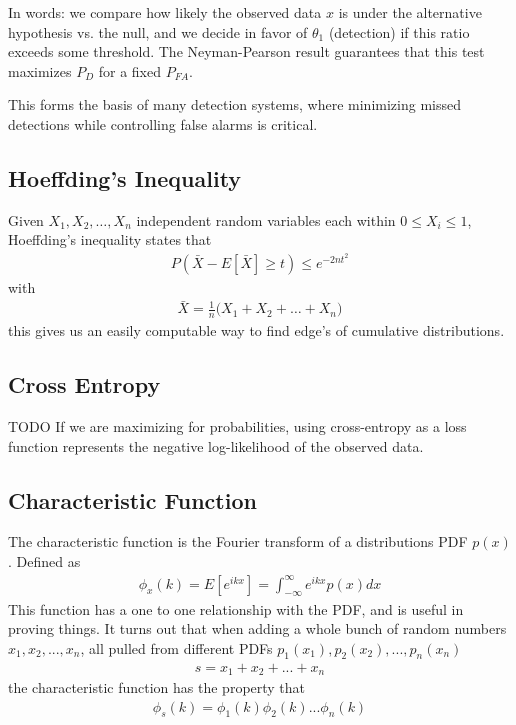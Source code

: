 In words: we compare how likely the observed data $x$ is under the alternative hypothesis vs. the null, and we decide in favor of $\theta_1$ (detection) if this ratio exceeds some threshold. The Neyman-Pearson result guarantees that this test maximizes $P_D$ for a fixed $P_{FA}$.

This forms the basis of many detection systems, where minimizing missed detections while controlling false alarms is critical.

\subsection{Hoeffding's Inequality}\label{hoeffding}
Given $X_1, X_2, \ldots, X_n$ independent random variables each within $0 \leq X_i \leq 1$, Hoeffding's inequality states that 
\begin{align}
	P(\bar{X} - E[\bar{X}] \geq t) \leq e^{-2nt^2}
\end{align}
with 
\begin{align}
	\bar{X} = \frac{1}{n}\Big(X_1+X_2+\ldots+X_n\Big)
\end{align}
this gives us an easily computable way to find edge's of cumulative distributions.
 
\subsection{Cross Entropy}
TODO
If we are maximizing for probabilities, using cross-entropy as a loss function represents the negative log-likelihood of the observed data\cite{grus}.

\subsection{Characteristic Function}
The characteristic function is the Fourier transform of a distributions PDF $p(x)$. Defined as 
\begin{align}
\phi_x(k) = E[e^{ikx}] = \int_{-\infty}^\infty e^{ikx}p(x)dx
\end{align}
This function has a one to one relationship with the PDF, and is useful in proving things. It turns out that when adding a whole bunch of random numbers $x_1, x_2, ..., x_n$, all pulled from different PDFs $p_1(x_1), p_2(x_2), ..., p_n(x_n)$
\begin{align}
s = x_1 + x_2 + ... + x_n
\end{align}
the characteristic function has the property that
\begin{align}
\phi_s(k) =\phi_1(k)\phi_2(k)...\phi_n(k)
\end{align}


